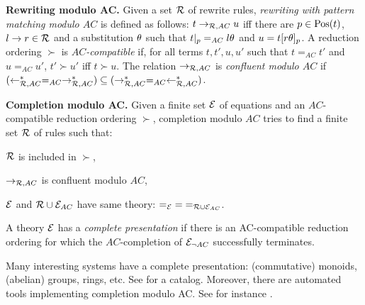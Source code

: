 \noindent
{\bf Rewriting modulo AC.} Given a set $\mathcal{R}$ of rewrite rules, {\em
rewriting with pattern matching modulo $AC$} is defined as follows:
$t\rightarrow_{\mathcal{R},AC} u$ iff there are $p\in\mathrm{Pos}(t)$, $l\rightarrow r\in\mathcal{R}$ and a
substitution $\theta$ such that $t|_p=_{AC}l\theta$ and $u=t[r\theta]_p$. A
reduction ordering $\succ$ is {\em $AC$-compatible} if, for all terms
$t,t',u,u'$ such that $t=_{AC}t'$ and $ u=_{AC}u'$, $t'\succ u'$ iff
$t\succ u$. The relation $\rightarrow_{\mathcal{R},AC}$ is {\em confluent modulo $AC$}
if ${(\leftarrow^*_{\mathcal{R},AC}=_{AC}\rightarrow^*_{\mathcal{R},AC})}\subseteq
{(\rightarrow^*_{\mathcal{R},AC}=_{AC}\leftarrow^*_{\mathcal{R},AC})}$.\vsp[2mm]


\noindent
{\bf Completion modulo AC.} Given a finite set $\mathcal{E}$ of equations and
an $AC$-compatible reduction ordering $\succ$, completion modulo $AC$
\cite{peterson81jacm} tries to find a finite set $\mathcal{R}$ of rules such
that:

\begin{lst}{\bu}
\item $\mathcal{R}$ is included in $\succ$,
\item $\rightarrow_{\mathcal{R},AC}$ is confluent modulo $AC$,
\item $\mathcal{E}$ and $\mathcal{R}\cup\mathcal{E}_{AC}$ have same theory:
${=_\mathcal{E}}={=_{\mathcal{R}\cup\mathcal{E}_{AC}}}$.
\end{lst}


\begin{dfn}
A theory $\mathcal{E}$ has a {\em complete presentation} if there is an
AC-com\-patible reduction ordering for which the $AC$-completion of
$\mathcal{E}_{\neg AC}$ successfully terminates.
\end{dfn}

Many interesting systems have a complete presentation: (commutative)
mo\-no\-ids, (abelian) groups, rings, etc. See
\cite{hullot80thesis,lechenadec86book} for a catalog. Moreover,
there are automated tools implementing completion modulo AC. See for
instance \cite{cime2.02,gaillourdet03cade}.


